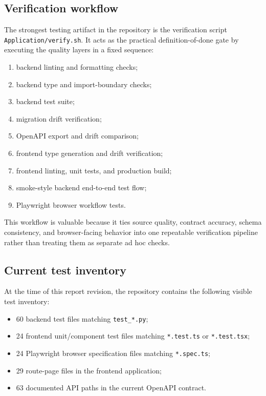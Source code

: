 \subsection{Verification workflow}

The strongest testing artifact in the repository is the verification script \texttt{Application/verify.sh}. It acts as the practical definition-of-done gate by executing the quality layers in a fixed sequence:

\begin{enumerate}
    \item backend linting and formatting checks;
    \item backend type and import-boundary checks;
    \item backend test suite;
    \item migration drift verification;
    \item OpenAPI export and drift comparison;
    \item frontend type generation and drift verification;
    \item frontend linting, unit tests, and production build;
    \item smoke-style backend end-to-end test flow;
    \item Playwright browser workflow tests.
\end{enumerate}

This workflow is valuable because it ties source quality, contract accuracy, schema consistency, and browser-facing behavior into one repeatable verification pipeline rather than treating them as separate ad hoc checks.

\subsection{Current test inventory}

At the time of this report revision, the repository contains the following visible test inventory:

\begin{itemize}
    \item 60 backend test files matching \texttt{test\_*.py};
    \item 24 frontend unit/component test files matching \texttt{*.test.ts} or \texttt{*.test.tsx};
    \item 24 Playwright browser specification files matching \texttt{*.spec.ts};
    \item 29 route-page files in the frontend application;
    \item 63 documented API paths in the current OpenAPI contract.
\end{itemize}

